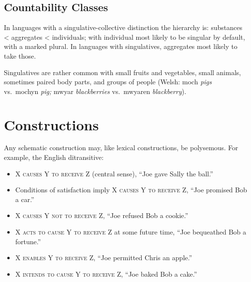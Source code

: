 \documentclass[11pt]{article}
\newcommand{\I}[1]{\textsc{#1}}   %
\newenvironment{grammarlist}%
 {\begin{itemize}\addtolength{\itemsep}{-0.5\baselineskip}\ignorespaces}%
 {\end{itemize}\ignorespacesafterend}
\begin{document}
\subsection{Countability Classes}  In languages with a
singulative-collective distinction the hierarchy is: substances <
aggregates < individuals; with individual most likely to be singular
by default, with a marked plural.  In languages with singulatives,
aggregates most likely to take those.

Singulatives are rather common with small fruits and vegetables, small
animals, sometimes paired body parts, and groups of people (Welsh:
moch \textit{pigs} vs.\ mochyn \textit{pig;} mwyar
\textit{blackberries} vs.\ mwyaren \textit{blackberry}).



\section{Constructions}
Any schematic construction may, like lexical constructions, be
polysemous.  For example, the English ditransitive:

\begin{grammarlist}
  \item \I{X causes Y to receive Z} (central sense), ``Joe gave Sally
    the ball.''
  \item Conditions of satisfaction imply \I{X causes Y to receive Z},
    ``Joe promised Bob a car.''
  \item \I{X causes Y not to receive Z}, ``Joe refused Bob a cookie.''
  \item \I{X acts to cause Y to receive Z} at some future time, ``Joe
    bequeathed Bob a fortune.''
  \item \I{X enables Y to receive Z}, ``Joe permitted Chris an
    apple.''
  \item \I{X intends to cause Y to receive Z}, ``Joe baked Bob a cake.''
\end{grammarlist}
\end{document}
